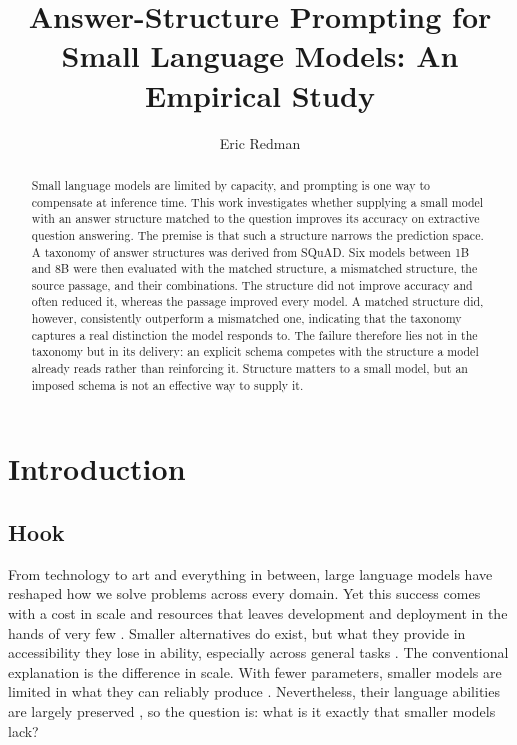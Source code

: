 \documentclass{article}
\title{Answer-Structure Prompting for Small Language Models:
An Empirical Study}
\author{Eric Redman}
\begin{document}
\maketitle

\begin{abstract}
Small language models are limited by capacity, and prompting is one way to compensate at inference time. This work investigates whether supplying a small model with an answer structure matched to the question improves its accuracy on extractive question answering. The premise is that such a structure narrows the prediction space. A taxonomy of answer structures was derived from SQuAD. Six models between 1B and 8B were then evaluated with the matched structure, a mismatched structure, the source passage, and their combinations. The structure did not improve accuracy and often reduced it, whereas the passage improved every model. A matched structure did, however, consistently outperform a mismatched one, indicating that the taxonomy captures a real distinction the model responds to. The failure therefore lies not in the taxonomy but in its delivery: an explicit schema competes with the structure a model already reads rather than reinforcing it. Structure matters to a small model, but an imposed schema is not an effective way to supply it.
\end{abstract}

\section{Introduction}

\subsection{Hook}

From technology to art and everything in between, large language models have reshaped how we solve problems across every domain. Yet this success comes with a cost in scale and resources that leaves development and deployment in the hands of very few \cite{eloundou2023gpts, strubell2019energy}. Smaller alternatives do exist, but what they provide in accessibility they lose in ability, especially across general tasks \cite{smalllmsready2024, slm_survey2024}. The conventional explanation is the difference in scale. With fewer parameters, smaller models are limited in what they can reliably produce \cite{kaplan2020scaling, costofdownscaling2023}. Nevertheless, their language abilities are largely preserved \cite{linguistic_competence_scale2025}, so the question is: what is it exactly that smaller models lack?
\end{document}
